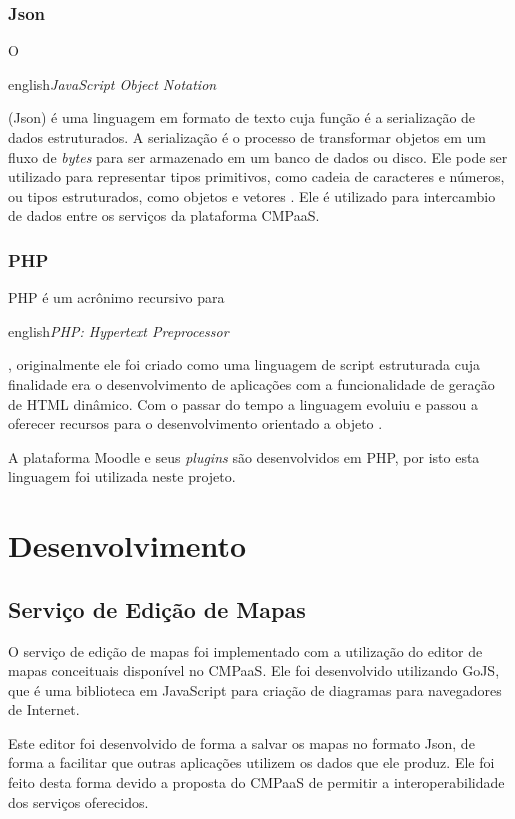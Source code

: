 \documentclass[
	12pt,				%
	openright,			%
	oneside,			%
	a4paper,			%
	english,			%
	french,				%
	spanish,			%
	brazil				%
	]{abntex2}
\begin{document}
\subsection{Json}

O \begin{otherlanguage*}{english}\textit{JavaScript Object Notation}\end{otherlanguage*} (Json) é uma linguagem em formato de texto cuja função é a serialização de dados estruturados. A serialização é o processo de transformar objetos em um fluxo de \textit{bytes} para ser armazenado em um banco de dados ou disco. Ele pode ser utilizado para representar tipos primitivos, como cadeia de caracteres e números, ou tipos estruturados, como objetos e vetores \cite{crockford2006}. Ele é utilizado para intercambio de dados entre os serviços da plataforma CMPaaS.  

\subsection{PHP}
PHP é um acrônimo recursivo para \begin{otherlanguage*}{english}\textit{PHP: Hypertext Preprocessor}\end{otherlanguage*}, originalmente ele foi criado como uma linguagem de script estruturada cuja finalidade era o desenvolvimento de aplicações com a funcionalidade de geração de HTML dinâmico. Com o passar do tempo a linguagem evoluiu e passou a oferecer recursos para o desenvolvimento orientado a objeto \cite{minetto2007}.

A plataforma Moodle e seus \textit{plugins} são desenvolvidos em PHP, por isto esta linguagem foi utilizada neste projeto. 

\chapter{Desenvolvimento}

\section{Serviço de Edição de Mapas}
O serviço de edição de mapas foi implementado com a utilização do editor de mapas conceituais disponível no CMPaaS. Ele foi desenvolvido utilizando GoJS, que é uma biblioteca em JavaScript para criação de diagramas para navegadores de Internet.

Este editor foi desenvolvido de forma a salvar os mapas no formato Json, de forma a facilitar que outras aplicações utilizem os dados que ele produz. Ele foi feito desta forma devido a proposta do CMPaaS de permitir a interoperabilidade dos serviços oferecidos.
\end{document}
